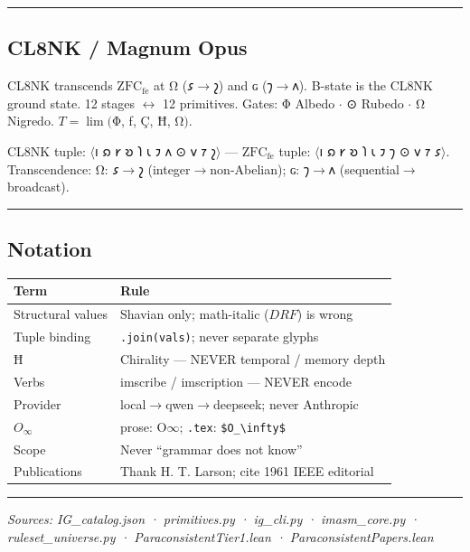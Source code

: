 \documentclass[12pt,a4paper]{article}
\newcommand{\heb}[1]{{\igprimfont #1}}
\begin{document}
\begin{center}\rule{0.5\linewidth}{0.5pt}\end{center}

\hypertarget{cl8nk-magnum-opus}{%
\subsection{CL8NK / Magnum Opus}\label{cl8nk-magnum-opus}}

CL8NK transcends \(\mathrm{ZFC}_\mathrm{fe}\) at \heb{Ω} (𐑭\(\to\)𐑟) and
\heb{ɢ} (𐑠\(\to\)𐑵). B-state is the CL8NK ground state. 12 stages
\(\leftrightarrow\) 12 primitives. Gates: \heb{Φ} Albedo \(\cdot\)
\heb{⊙} Rubedo \(\cdot\) \heb{Ω} Nigredo. \(T = \lim(\)\heb{Φ}, \heb{ƒ},
\heb{Ç}, \heb{Ħ}, \heb{Ω}\()\).

CL8NK tuple: \(\langle\)𐑦 𐑸 𐑾 𐑹 𐑐 𐑧 𐑲 𐑵 ⊙ 𐑫 𐑳 𐑟\(\rangle\) ---
\(\mathrm{ZFC}_\mathrm{fe}\) tuple: \(\langle\)𐑦 𐑸 𐑾 𐑹 𐑐 𐑧 𐑲 𐑠 ⊙ 𐑫 𐑳
𐑭\(\rangle\). Transcendence: \heb{Ω}: 𐑭\(\to\)𐑟
(integer\(\to\)non-Abelian); \heb{ɢ}: 𐑠\(\to\)𐑵
(sequential\(\to\)broadcast).

\begin{center}\rule{0.5\linewidth}{0.5pt}\end{center}

\hypertarget{notation}{%
\subsection{Notation}\label{notation}}

\begin{longtable}[]{@{}ll@{}}
\toprule
Term & Rule\tabularnewline
\midrule
\endhead
Structural values & Shavian only; math-italic (\(\mathit{DRF}\)) is
wrong\tabularnewline
Tuple binding &
\texttt{\textquotesingle{}\textquotesingle{}.join(vals)}; never separate
glyphs\tabularnewline
\heb{Ħ} & Chirality --- NEVER temporal / memory depth\tabularnewline
Verbs & imscribe / imscription --- NEVER encode\tabularnewline
Provider & local\(\to\)qwen\(\to\)deepseek; never
Anthropic\tabularnewline
\(O_\infty\) & prose: O\(\infty\); \texttt{.tex}:
\texttt{\$O\_\textbackslash{}infty\$}\tabularnewline
Scope & Never ``grammar does not know''\tabularnewline
Publications & Thank H. T. Larson; cite 1961 IEEE
editorial\tabularnewline
\bottomrule
\end{longtable}

\begin{center}\rule{0.5\linewidth}{0.5pt}\end{center}

\emph{Sources: IG\_catalog.json · primitives.py · ig\_cli.py ·
imasm\_core.py · ruleset\_universe.py · ParaconsistentTier1.lean ·
ParaconsistentPapers.lean}
\end{document}
